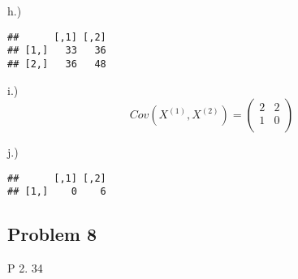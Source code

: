 \documentclass[
]{article}
\newenvironment{Shaded}{\begin{snugshade}}{\end{snugshade}}
\newcommand{\DataTypeTok}[1]{\textcolor[rgb]{0.13,0.29,0.53}{#1}}
\newcommand{\DecValTok}[1]{\textcolor[rgb]{0.00,0.00,0.81}{#1}}
\newcommand{\KeywordTok}[1]{\textcolor[rgb]{0.13,0.29,0.53}{\textbf{#1}}}
\newcommand{\NormalTok}[1]{#1}
\newcommand{\OperatorTok}[1]{\textcolor[rgb]{0.81,0.36,0.00}{\textbf{#1}}}
\newcommand{\StringTok}[1]{\textcolor[rgb]{0.31,0.60,0.02}{#1}}
\begin{document}
h.)

\begin{Shaded}
\end{Shaded}

\begin{verbatim}
##      [,1] [,2]
## [1,]   33   36
## [2,]   36   48
\end{verbatim}

i.) \[ 
Cov(X^{(1)},X^{(2)}) = \begin{pmatrix}
2  & 2\\
1 & 0 \\
\end{pmatrix} 
\]

j.)

\begin{Shaded}
\end{Shaded}

\begin{verbatim}
##      [,1] [,2]
## [1,]    0    6
\end{verbatim}

\hypertarget{problem-8}{%
\subsection{Problem 8}\label{problem-8}}

P 2. 34
\end{document}

